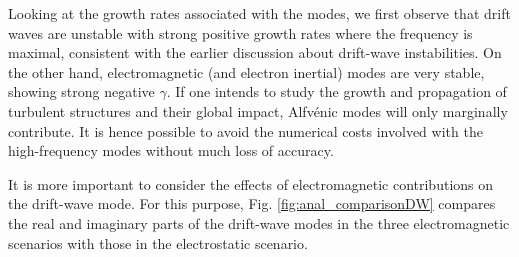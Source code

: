 Looking at the growth rates associated with the modes, we first observe that drift waves are unstable with strong positive growth rates where the frequency is maximal, consistent with the earlier discussion about drift-wave instabilities. On the other hand, electromagnetic (and electron inertial) modes are very stable, showing strong negative $\gamma$. If one intends to study the growth and propagation of turbulent structures and their global impact, Alfvénic modes will only marginally contribute. It is hence possible to avoid the numerical costs involved with the high-frequency modes without much loss of accuracy.

It is more important to consider the effects of electromagnetic contributions on the drift-wave mode. For this purpose, Fig. \ref{fig:anal_comparisonDW} compares the real and imaginary parts of the drift-wave modes in the three electromagnetic scenarios with those in the electrostatic scenario.

